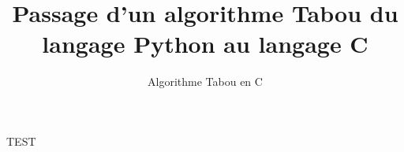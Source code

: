 \documentclass[hideweeklyreports]{polytech/polytech}
\title{Passage d'un algorithme Tabou du langage Python au langage C}
\subtitle{Algorithme Tabou en C}
\begin{document}
	TEST
\end{document}
